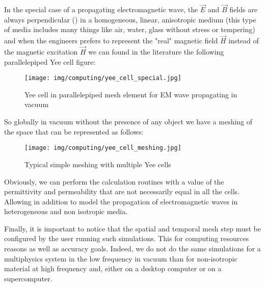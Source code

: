 	In the special case of a propagating electromagnetic wave, the $\vec{E}$ and $\vec{B}$ fields are always perpendicular () in a homogeneous, linear, anisotropic medium (this type of media includes many things like air, water, glass without stress or tempering) and when the engineers prefers to represent the "real" magnetic field $\vec{H}$ instead of the magnetic excitation $\vec{H}$ we can found in the literature the following parallelepiped Yee cell figure:
	\begin{figure}[H]
		\centering
		\texttt{[image: img/computing/yee\_cell\_special.jpg]}
		\caption{Yee cell in parallelepiped mesh element for EM wave propagating in vacuum}
	\end{figure}
	So globally in vacuum without the presence of any object we have a meshing of the space that can be represented as follows:
	\begin{figure}[H]
		\centering
		\texttt{[image: img/computing/yee\_cell\_meshing.jpg]}
		\caption{Typical simple meshing with multiple Yee cells}
	\end{figure}
	Obviously, we can perform the calculation routines with a value of the permittivity and permeability that are not necessarily equal in all the cells. Allowing in addition to model the propagation of electromagnetic waves in heterogeneous and non isotropic media.
	
	Finally, it is important to notice that the spatial and temporal mesh step must be configured by the user running such simulations. This for computing resources reasons as well as accuracy goals. Indeed, we do not do the same simulations for  a multiphysics system in the low frequency in  vacuum than for non-isotropic material at high frequency and, either on a desktop computer or on a supercomputer.
	
	\pagebreak

